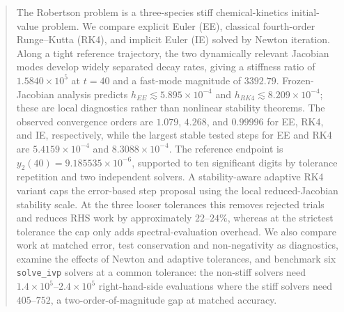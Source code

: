 \begin{abstract}
The Robertson problem is a three-species stiff chemical-kinetics initial-value problem. We compare explicit Euler (EE), classical fourth-order Runge--Kutta (RK4), and implicit Euler (IE) solved by Newton iteration. Along a tight reference trajectory, the two dynamically relevant Jacobian modes develop widely separated decay rates, giving a stiffness ratio of $1.5840\times10^5$ at $t=40$ and a fast-mode magnitude of $3392.79$. Frozen-Jacobian analysis predicts $h_{EE}\lesssim5.895\times10^{-4}$ and $h_{RK4}\lesssim8.209\times10^{-4}$; these are local diagnostics rather than nonlinear stability theorems. The observed convergence orders are $1.079$, $4.268$, and $0.99996$ for EE, RK4, and IE, respectively, while the largest stable tested steps for EE and RK4 are $5.4159\times10^{-4}$ and $8.3088\times10^{-4}$. The reference endpoint is $y_2(40)=9.185535\times10^{-6}$, supported to ten significant digits by tolerance repetition and two independent solvers. A stability-aware adaptive RK4 variant caps the error-based step proposal using the local reduced-Jacobian stability scale. At the three looser tolerances this removes rejected trials and reduces RHS work by approximately $22$--$24\%$, whereas at the strictest tolerance the cap only adds spectral-evaluation overhead. We also compare work at matched error, test conservation and non-negativity as diagnostics, examine the effects of Newton and adaptive tolerances, and benchmark six \texttt{solve\_ivp} solvers at a common tolerance: the non-stiff solvers need $1.4\times10^{5}$--$2.4\times10^{5}$ right-hand-side evaluations where the stiff solvers need $405$--$752$, a two-order-of-magnitude gap at matched accuracy.
\end{abstract}
